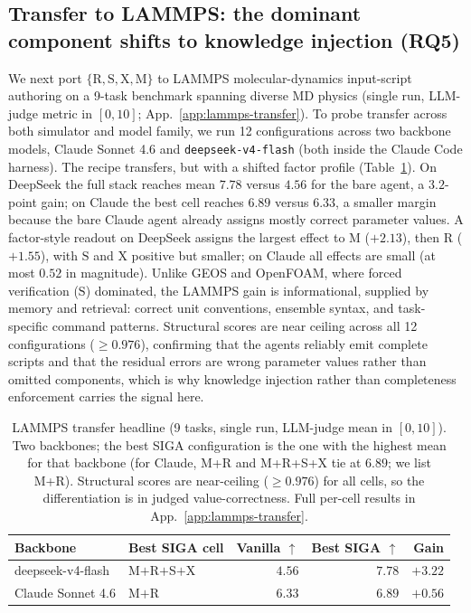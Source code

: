\documentclass{article}
\begin{document}
\subsection{Transfer to LAMMPS: the dominant component shifts to knowledge injection (RQ5)}
\label{subsec:lammps-transfer}

We next port $\{\mathrm{R,S,X,M}\}$ to LAMMPS molecular-dynamics input-script authoring on a 9-task benchmark spanning diverse MD physics (single run, LLM-judge metric in $[0,10]$; App.~\ref{app:lammps-transfer}). To probe transfer across both simulator and model family, we run 12 configurations across two backbone models, Claude Sonnet 4.6 and \texttt{deepseek-v4-flash} (both inside the Claude Code harness). The recipe transfers, but with a shifted factor profile (Table~\ref{tab:lammps-headline}). On DeepSeek the full stack reaches mean $7.78$ versus $4.56$ for the bare agent, a $3.2$-point gain; on Claude the best cell reaches $6.89$ versus $6.33$, a smaller margin because the bare Claude agent already assigns mostly correct parameter values. A factor-style readout on DeepSeek assigns the largest effect to $\mathrm{M}$ ($+2.13$), then $\mathrm{R}$ ($+1.55$), with $\mathrm{S}$ and $\mathrm{X}$ positive but smaller; on Claude all effects are small (at most $0.52$ in magnitude). Unlike GEOS and OpenFOAM, where forced verification ($\mathrm{S}$) dominated, the LAMMPS gain is informational, supplied by memory and retrieval: correct unit conventions, ensemble syntax, and task-specific command patterns. Structural scores are near ceiling across all 12 configurations ($\geq 0.976$), confirming that the agents reliably emit complete scripts and that the residual errors are wrong parameter values rather than omitted components, which is why knowledge injection rather than completeness enforcement carries the signal here.

\begin{table}[t]
  \caption{LAMMPS transfer headline (9 tasks, single run, LLM-judge mean in $[0,10]$). Two backbones; the best SIGA configuration is the one with the highest mean for that backbone (for Claude, M+R and M+R+S+X tie at $6.89$; we list M+R). Structural scores are near-ceiling ($\geq 0.976$) for all cells, so the differentiation is in judged value-correctness. Full per-cell results in App.~\ref{app:lammps-transfer}.}
  \label{tab:lammps-headline}
  \centering
  \small
  \begin{tabular}{llrrr}
    \toprule
    \textbf{Backbone} & \textbf{Best SIGA cell} & \textbf{Vanilla} $\uparrow$ & \textbf{Best SIGA} $\uparrow$ & \textbf{Gain} \\
    \midrule
    deepseek-v4-flash & M$+$R$+$S$+$X & $4.56$ & $\mathbf{7.78}$ & $+3.22$ \\
    Claude Sonnet 4.6 & M$+$R         & $6.33$ & $6.89$          & $+0.56$ \\
    \bottomrule
  \end{tabular}
\end{table}
\end{document}
